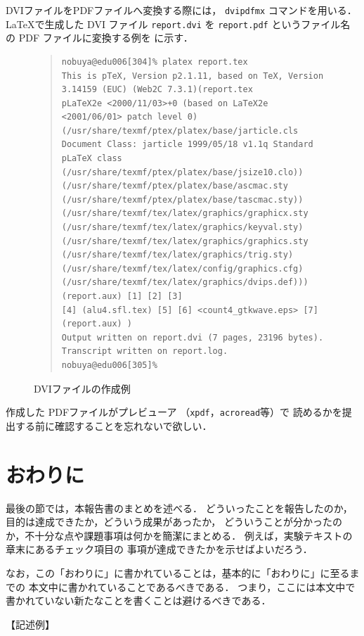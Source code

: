 \documentclass{jarticle}[11pt]
\newcommand{\figref}[1]{\makebox{図~\ref{#1}}}
\begin{document}
DVIファイルをPDFファイルへ変換する際には，
\verb|dvipdfmx| コマンドを用いる．
\LaTeX で生成した DVI ファイル \verb|report.dvi| を
\verb|report.pdf| というファイル名の PDF ファイルに変換する例を
\figref{fig:DVIファイルの作成例}に示す．
\begin{figure}[htb]
{\small
\begin{quote}
\begin{verbatim}
nobuya@edu006[304]% platex report.tex
This is pTeX, Version p2.1.11, based on TeX, Version 3.14159 (EUC) (Web2C 7.3.1)(report.tex
pLaTeX2e <2000/11/03>+0 (based on LaTeX2e <2001/06/01> patch level 0)
(/usr/share/texmf/ptex/platex/base/jarticle.cls
Document Class: jarticle 1999/05/18 v1.1q Standard pLaTeX class
(/usr/share/texmf/ptex/platex/base/jsize10.clo))
(/usr/share/texmf/ptex/platex/base/ascmac.sty
(/usr/share/texmf/ptex/platex/base/tascmac.sty))
(/usr/share/texmf/tex/latex/graphics/graphicx.sty
(/usr/share/texmf/tex/latex/graphics/keyval.sty)
(/usr/share/texmf/tex/latex/graphics/graphics.sty
(/usr/share/texmf/tex/latex/graphics/trig.sty)
(/usr/share/texmf/tex/latex/config/graphics.cfg)
(/usr/share/texmf/tex/latex/graphics/dvips.def))) (report.aux) [1] [2] [3]
[4] (alu4.sfl.tex) [5] [6] <count4_gtkwave.eps> [7] (report.aux) )
Output written on report.dvi (7 pages, 23196 bytes).
Transcript written on report.log.
nobuya@edu006[305]%
\end{verbatim}
\end{quote}
} %
\caption{DVIファイルの作成例}
\label{fig:DVIファイルの作成例}
\end{figure}
作成した PDFファイルがプレビューア （\verb|xpdf|，\verb|acroread|等）で
読めるかを提出する前に確認することを忘れないで欲しい．

\section{おわりに}
\label{sec:おわりに}
最後の節では，本報告書のまとめを述べる．
どういったことを報告したのか，目的は達成できたか，どういう成果があったか，
どういうことが分かったのか，不十分な点や課題事項は何かを簡潔にまとめる．
例えば，実験テキスト\cite{bib:実験テキスト}の章末にあるチェック項目の
事項が達成できたかを示せばよいだろう．

なお，この「おわりに」に書かれていることは，基本的に「おわりに」に至るまでの
本文中に書かれていることであるべきである．
つまり，ここには本文中で書かれていない新たなことを書くことは避けるべきである．

\noindent
【記述例】
\end{document}
